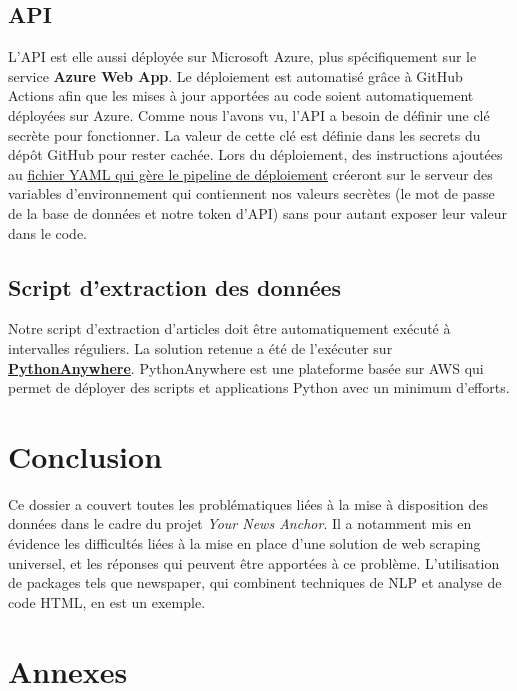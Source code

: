\documentclass[french]{article}
\begin{document}
    \subsection{API}

    L'API est elle aussi déployée sur Microsoft Azure, plus spécifiquement sur le service \textbf{Azure Web App}. Le déploiement est automatisé grâce à GitHub Actions afin que les mises à jour apportées au code soient automatiquement déployées sur Azure.
    Comme nous l'avons vu, l'API a besoin de définir une clé secrète pour fonctionner. La valeur de cette clé est définie dans les secrets du dépôt GitHub pour rester cachée. Lors du déploiement, des instructions ajoutées au \href{https://github.com/vinpap/your_news_anchor/blob/08cebb688dfc9437e1e86076eea93f41e9b3fbe1/.github/workflows/main_vincent-your-news-anchor.yml}{fichier YAML qui gère le pipeline de déploiement} créeront sur le serveur des variables d'environnement qui contiennent nos valeurs secrètes (le mot de passe de la base de données et notre token d'API) sans pour autant exposer leur valeur dans le code.

    \subsection{Script d'extraction des données}

    Notre script d'extraction d'articles doit être automatiquement exécuté à intervalles réguliers. La solution retenue a été de l'exécuter sur \textbf{\href{https://www.pythonanywhere.com/}{PythonAnywhere}}. PythonAnywhere est une plateforme basée sur AWS qui permet de déployer des scripts et applications Python avec un minimum d'efforts.

    \section*{Conclusion}

    Ce dossier a couvert toutes les problématiques liées à la mise à disposition des données dans le cadre du projet \textit{Your News Anchor}. Il a notamment mis en évidence les difficultés liées à la mise en place d'une solution de web scraping universel, et les réponses qui peuvent être apportées à ce problème. L'utilisation de packages tels que newspaper, qui combinent techniques de NLP et analyse de code HTML, en est un exemple.


    \appendix
    \newpage
    \section*{Annexes \huge \centering}
\end{document}
